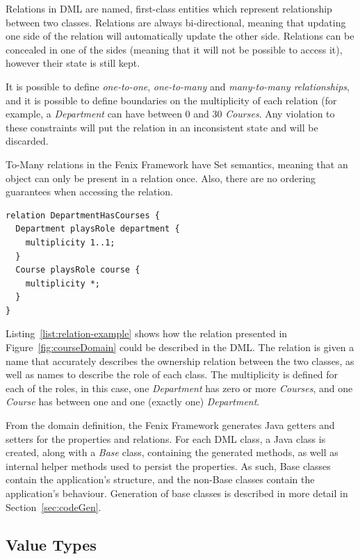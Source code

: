Relations in DML are named, first-class entities which represent
relationship between two classes. Relations are always bi-directional,
meaning that updating one side of the relation will automatically
update the other side. Relations can be concealed in one of the sides
(meaning that it will not be possible to access it), however their
state is still kept.

It is possible to define {\it one-to-one}, {\it one-to-many} and {\it
  many-to-many relationships}, and it is possible to define boundaries
on the multiplicity of each relation (for example, a {\it Department} can
have between 0 and 30 {\it Courses}. Any violation to these
constraints will put the relation in an inconsistent state and will be
discarded. 

To-Many relations in the Fenix Framework have Set semantics, meaning
that an object can only be present in a relation once. Also, there are
no ordering guarantees when accessing the relation.

\begin{lstlisting}[caption={DML for the relation between {\it Course}
    and {\it Department}},label={list:relation-example}]
relation DepartmentHasCourses {
  Department playsRole department {
    multiplicity 1..1;
  }
  Course playsRole course {
    multiplicity *;
  }
}
\end{lstlisting}

Listing~\ref{list:relation-example} shows how the relation presented
in Figure~\ref{fig:courseDomain} could be described in the DML. The
relation is given a name that accurately describes the ownership
relation between the two classes, as well as names to describe the
role of each class. The multiplicity is defined for each of the roles,
in this case, one {\it Department} has zero or more {\it Courses}, and
one {\it Course} has between one and one (exactly one) {\it
  Department}.


From the domain definition, the Fenix Framework generates Java getters
and setters for the properties and relations. For each DML class, a
Java class is created, along with a {\it Base} class, containing the
generated methods, as well as internal helper methods used to persist
the properties. As such, Base classes contain the application's
structure, and the non-Base classes contain the application's
behaviour. Generation of base classes is described in more detail in
Section~\ref{sec:codeGen}.

\subsection{Value Types}

